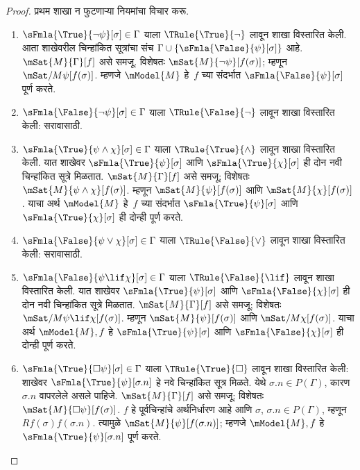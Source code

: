 \begin{proof}
प्रथम शाखा न फुटणाऱ्या नियमांचा विचार करू.
\begin{enumerate}
\item $\sFmla{\True}{\lnot \psi}[\sigma] \in \Gamma$
  याला
  $\TRule{\True}{\lnot}$ लावून शाखा विस्तारित
  केली. आता शाखेवरील चिन्हांकित सूत्रांचा
  संच $\Gamma \cup
  \{\sFmla{\False}{\psi}[\sigma]\}$ आहे.
  $\mSat{M}{\Gamma}[f]$ असे समजू. विशेषतः
  $\mSat{M}{\lnot \psi}[f(\sigma)]$; म्हणून
  $\mSat/{M}{\psi}[f(\sigma)]$. म्हणजे
  $\mModel{M}$ हे~$f$ च्या संदर्भात
  $\sFmla{\False}{\psi}[\sigma]$ पूर्ण करते.
\item $\sFmla{\False}{\lnot \psi}[\sigma] \in \Gamma$
  याला
  $\TRule{\False}{\lnot}$ लावून शाखा विस्तारित
  केली: सरावासाठी.
\item $\sFmla{\True}{\psi \land \chi}[\sigma] \in \Gamma$
  याला
  $\TRule{\True}{\land}$ लावून शाखा विस्तारित
  केली. यात शाखेवर
  $\sFmla{\True}{\psi}[\sigma]$ आणि
  $\sFmla{\True}{\chi}[\sigma]$ ही दोन नवी
  चिन्हांकित सूत्रे मिळतात.
  $\mSat{M}{\Gamma}[f]$ असे समजू; विशेषतः
  $\mSat{M}{\psi \land \chi}[f(\sigma)]$.
  म्हणून $\mSat{M}{\psi}[f(\sigma)]$ आणि
  $\mSat{M}{\chi}[f(\sigma)]$. याचा अर्थ
  $\mModel{M}$ हे~$f$ च्या संदर्भात
  $\sFmla{\True}{\psi}[\sigma]$ आणि
  $\sFmla{\True}{\chi}[\sigma]$ ही दोन्ही
  पूर्ण करते.
\item $\sFmla{\False}{\psi \lor \chi}[\sigma] \in \Gamma$
  याला
  $\TRule{\False}{\lor}$ लावून शाखा विस्तारित
  केली: सरावासाठी.
\item $\sFmla{\False}{\psi \lif \chi}[\sigma] \in \Gamma$
  याला
  $\TRule{\False}{\lif}$ लावून शाखा विस्तारित
  केली. यात शाखेवर
  $\sFmla{\True}{\psi}[\sigma]$ आणि
  $\sFmla{\False}{\chi}[\sigma]$ ही दोन नवी
  चिन्हांकित सूत्रे मिळतात.
  $\mSat{M}{\Gamma}[f]$ असे समजू; विशेषतः
  $\mSat/{M}{\psi \lif \chi}[f(\sigma)]$.
  म्हणून $\mSat{M}{\psi}[f(\sigma)]$ आणि
  $\mSat/{M}{\chi}[f(\sigma)]$. याचा अर्थ
  $\mModel{M}, f$ हे
  $\sFmla{\True}{\psi}[\sigma]$ आणि
  $\sFmla{\False}{\chi}[\sigma]$ ही दोन्ही
  पूर्ण करते.


\item $\sFmla{\True}{\Box \psi}[\sigma] \in \Gamma$
  याला
  $\TRule{\True}{\Box}$ लावून शाखा विस्तारित केली:
  शाखेवर
    $\sFmla{\True}{\psi}[\sigma.n]$ हे नवे
    चिन्हांकित सूत्र मिळते. येथे
    $\sigma.n \in P(\Gamma)$, कारण
    $\sigma.n$ वापरलेले असले पाहिजे.
    $\mSat{M}{\Gamma}[f]$ असे समजू; विशेषतः
    $\mSat{M}{\Box \psi}[f(\sigma)]$.
    $f$ हे पूर्वचिन्हांचे अर्थनिर्धारण आहे आणि
    $\sigma$, $\sigma.n \in P(\Gamma)$,
    म्हणून $Rf(\sigma)f(\sigma.n)$.
    त्यामुळे $\mSat{M}{\psi}[f(\sigma.n)]$;
    म्हणजे $\mModel{M}, f$ हे
    $\sFmla{\True}{\psi}[\sigma.n]$ पूर्ण करते.


\end{enumerate}
\end{proof}
